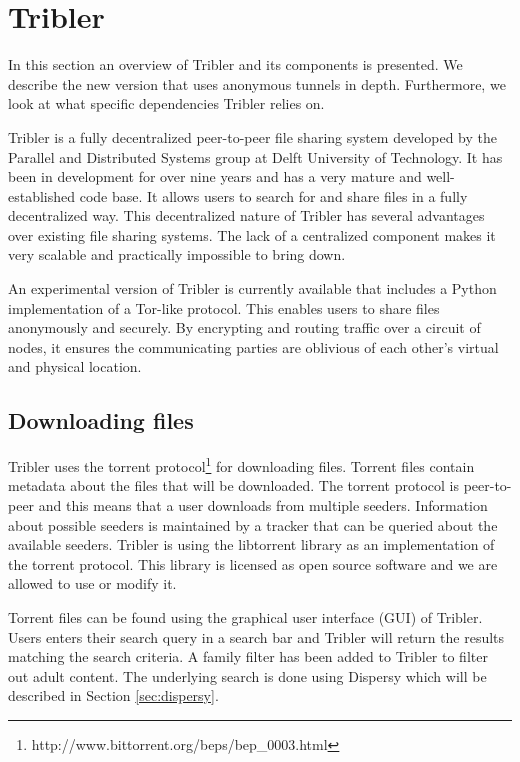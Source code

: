 
\section{Tribler}
	\label{sec:tribler}
	In this section an overview of Tribler and its components is presented. We describe the new version that uses anonymous tunnels in depth. Furthermore, we look at what specific dependencies Tribler relies on.

	Tribler is a fully decentralized peer-to-peer file sharing system developed by the Parallel and Distributed Systems group at Delft University of Technology. It has been in development for over nine years and has a very mature and well-established code base. It allows users to search for and share files in a fully decentralized way. This decentralized nature of Tribler has several advantages over existing file sharing systems. The lack of a centralized component makes it very scalable and practically impossible to bring down.

	An experimental version of Tribler is currently available that includes a Python implementation of a Tor-like protocol. This enables users to share files anonymously and securely. By encrypting and routing traffic over a circuit of nodes, it ensures the communicating parties are oblivious of each other's virtual and physical location.
	
	\subsection{Downloading files}
		Tribler uses the torrent protocol\footnote{http://www.bittorrent.org/beps/bep\_0003.html} for downloading files. Torrent files contain metadata about the files that will be downloaded. The torrent protocol is peer-to-peer and this means that a user downloads from multiple seeders. Information about possible seeders is maintained by a tracker that can be queried about the available seeders. Tribler is using the libtorrent library as an implementation of the torrent protocol. This library is licensed as open source software and we are allowed to use or modify it.
		
		Torrent files can be found using the graphical user interface (GUI) of Tribler. Users enters their search query in a search bar and Tribler will return the results matching the search criteria. A family filter has been added to Tribler to filter out adult content. The underlying search is done using Dispersy which will be described in Section \ref{sec:dispersy}.
	
